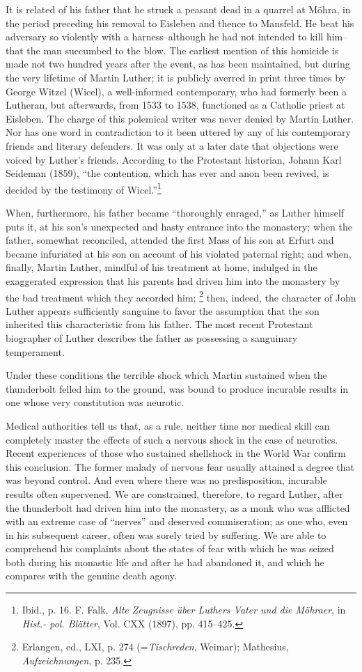 It is related of his father that he struck a peasant dead in a
quarrel at Möhra, in the period preceding his removal to Eisleben
and thence to Mansfeld. He beat his adversary so violently with
a harness--although he had not intended to kill him--that the
man succumbed to the blow. The earliest mention of this homicide
is made not two hundred years after the event, as has been maintained,
but during the very lifetime of Martin Luther; it is publicly averred
in print three times by George Witzel (Wicel), a well-informed
contemporary, who had formerly been a Lutheran, but afterwards,
from 1533 to 1538, functioned as a Catholic priest at Eisleben. The
charge of this polemical writer was never denied by Martin Luther.
Nor has one word in contradiction to it been uttered by any of his
contemporary friends and literary defenders. It was only at a later
date that objections were voiced by Luther’s friends. According to
the Protestant historian, Johann Karl Seideman (1859), “the contention,
which has ever and anon been revived, is decided by the testimony of Wicel.”\footnote
{Ibid., p. 16. F. Falk, \textit{Alte Zeugnisse über Luthers Vater und die Möhraer}, in \textit{Hist.- pol. Blätter}, Vol. CXX (1897), pp. 415--425.}

When, furthermore, his father became “thoroughly enraged,” as
Luther himself puts it, at his son’s unexpected and hasty entrance
into the monastery; when the father, somewhat reconciled, attended
the first Mass of his son at Erfurt and became infuriated at his
son on account of his violated paternal right; and when, finally,
Martin Luther, mindful of his treatment at home, indulged in the
exaggerated expression that his parents had driven him into the
monastery by the bad treatment which they accorded him;
\footnote{Erlangen, ed., LXI, p. 274 (=\textit{Tischreden}, Weimar); Mathesius, \textit{Aufzeichnungen}, p. 235.}
then, indeed, the character of John Luther appears sufficiently sanguine
to favor the assumption that the son inherited this characteristic
from his father. The most recent Protestant biographer of Luther
describes the father as possessing a sanguinary temperament.

Under these conditions the terrible shock which Martin sustained
when the thunderbolt felled him to the ground, was bound to produce
incurable results in one whose very constitution was neurotic.

Medical authorities tell us that, as a rule, neither time nor medical
skill can completely master the effects of such a nervous shock in
the case of neurotics. Recent experiences of those who sustained
shellshock in the World War confirm this conclusion. The former
malady of nervous fear usually attained a degree that was beyond
control. And even where there was no predisposition, incurable
results often supervened. We are constrained, therefore, to regard
Luther, after the thunderbolt had driven him into the monastery,
as a monk who was afflicted with an extreme case of “nerves” and
deserved commiseration; as one who, even in his subsequent career,
often was sorely tried by suffering. We are able to comprehend his
complaints about the states of fear with which he was seized both
during his monastic life and after he had abandoned it, and which
he compares with the genuine death agony.

